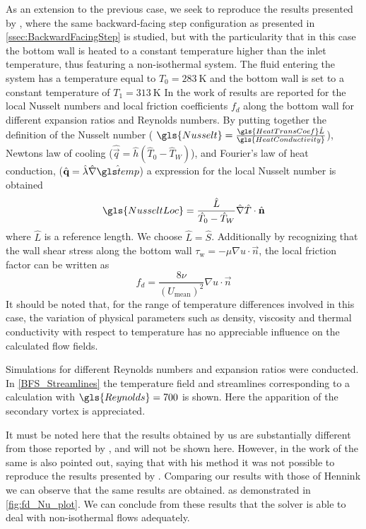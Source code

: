 As an extension to the previous case, we seek to reproduce the results presented by \cite{xieFluidFlowHeat2016}, where the same backward-facing step configuration as presented in \cref{ssec:BackwardFacingStep} is studied, but with the particularity that in this case the bottom wall is heated to a constant temperature higher than the inlet temperature, thus featuring a non-isothermal system. The fluid entering the system has a temperature equal to $T_0 = \SI{283}{\kelvin}$ and the bottom wall is set to a constant temperature of $T_1 =\SI{313}{\kelvin}$
In the work of \cite{xieFluidFlowHeat2016} results are reported for the local Nusselt numbers and local friction coefficients $f_d$  along the bottom wall for different expansion ratios and Reynolds numbers. By putting together the definition of the Nusselt number ( $\gls{Nusselt} = \frac{\gls{HeatTransCoef}\hat{L}}{\gls{HeatConductivity}}$), Newtons law of cooling ($\hat{\vec{q}} = \hat{h} (\hat{T}_0 - \hat{T}_W )$), and Fourier's law of heat  conduction, ($\hat{\vec{q}} = \hat \lambda \hat{\nabla} \glsHat{temp}$) a expression for the local Nusselt number is obtained
\begin{equation}
\gls{NusseltLoc} = \frac{\hat L}{\hat T_0-\hat T_W}\hat \nabla \hat T \cdot \hat {\vec{n}}
\end{equation}
where $\hat L$ is a reference length. We choose $ \hat L = \hat S$. Additionally by recognizing that the wall shear stress along the bottom wall $\tau_{\text{w}} = -\mu \nabla u \cdot \vec{n}$, the local friction factor can be written as
\begin{equation}
f_d = \frac{8\nu} { (U_{\text{mean}})^2}  \nabla u \cdot \vec{n} 
\end{equation}
It should be noted that, for the range of temperature differences involved in this case, the variation of physical parameters such as density, viscosity and thermal conductivity with respect to temperature has no appreciable influence on the calculated flow fields.

Simulations for different Reynolds numbers and expansion ratios were conducted. In \cref{BFS_Streamlines} the temperature field and streamlines corresponding to a calculation with $\gls{Reynolds} = 700$ is shown. Here the apparition of the secondary vortex is appreciated.

It must be noted here that the results obtained by us are substantially different from those reported by \cite{xieFluidFlowHeat2016}, and will not be shown here. However, in the work of \cite{henninkLowMachNumberFlow2022} the same is also pointed out, saying that with his method it was not possible to reproduce the results presented by \cite{xieFluidFlowHeat2016}. Comparing our results with those of Hennink we can observe that the same results are obtained. as demonstrated in \cref{fig:fd_Nu_plot}. We can conclude from these results that the solver is able to deal with non-isothermal flows adequately.  

